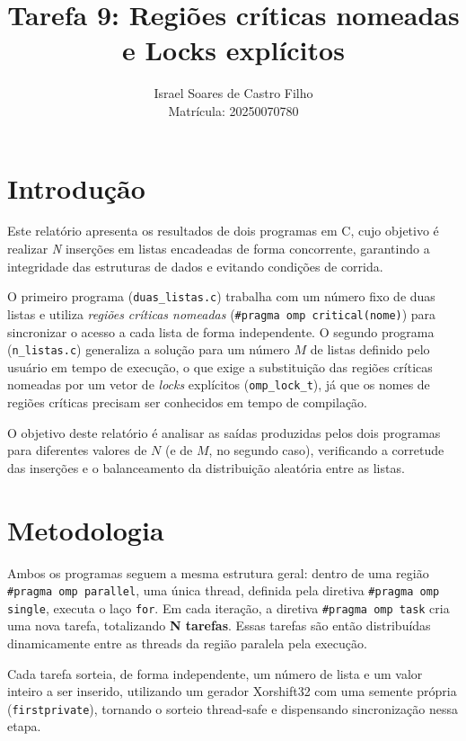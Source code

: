 \documentclass[a4paper,12pt]{article}
\title{Tarefa 9: Regiões críticas nomeadas e Locks explícitos}
\author{Israel Soares de Castro Filho \\ Matrícula: 20250070780}
\date{}
\begin{document}
\maketitle

\section{Introdução}

Este relatório apresenta os resultados de dois programas em C, 
cujo objetivo é realizar \textit{N} inserções em listas encadeadas de forma concorrente, 
garantindo a integridade das estruturas de dados e evitando condições de corrida.

O primeiro programa (\texttt{duas\_listas.c}) trabalha com um número fixo de duas listas e utiliza \emph{regiões críticas nomeadas} (\texttt{\#pragma omp critical(nome)}) para sincronizar o acesso a cada lista de forma independente. O segundo programa (\texttt{n\_listas.c}) generaliza a solução para um número $M$ de listas definido pelo usuário em tempo de execução, o que exige a substituição das regiões críticas nomeadas por um vetor de \emph{locks} explícitos (\texttt{omp\_lock\_t}), já que os nomes de regiões críticas precisam ser conhecidos em tempo de compilação.

O objetivo deste relatório é analisar as saídas produzidas pelos dois programas para diferentes valores de $N$ (e de $M$, no segundo caso), verificando a corretude das inserções e o balanceamento da distribuição aleatória entre as listas.

\section{Metodologia}

Ambos os programas seguem a mesma estrutura geral: 
dentro de uma região \texttt{\#pragma omp parallel}, 
uma única thread, definida pela diretiva \texttt{\#pragma omp single}, executa o laço \texttt{for}.
Em cada iteração, a diretiva \texttt{\#pragma omp task} cria uma nova tarefa, totalizando \textbf{N tarefas}.
Essas tarefas são então distribuídas dinamicamente entre as threads da região paralela pela execução.

Cada tarefa sorteia, de forma independente, um número de lista e um valor inteiro a ser inserido, utilizando 
um gerador Xorshift32 com uma semente própria (\texttt{firstprivate}), tornando o sorteio thread-safe e dispensando
sincronização nessa etapa.
\end{document}
